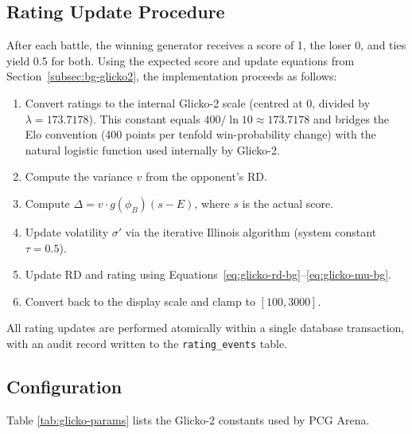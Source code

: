 \documentclass[shortabstract, mgr, english]{iithesis}
\begin{document}
\subsection{Rating Update Procedure}
\label{subsec:sd-glicko-update}

After each battle, the winning generator receives a score of 1, the loser 0, and ties
yield 0.5 for both. Using the expected score and update equations from
Section~\ref{subsec:bg-glicko2}, the implementation proceeds as follows:

\begin{enumerate}
    \item Convert ratings to the internal Glicko-2 scale (centred at 0, divided by
          $\lambda = 173.7178$).  This constant equals $400 / \ln 10 \approx 173.7178$
          and bridges the Elo convention (400 points per tenfold win-probability change)
          with the natural logistic function used internally by Glicko-2.
    \item Compute the variance $v$ from the opponent's RD.
    \item Compute $\Delta = v \cdot g(\phi_B)(s - E)$, where $s$ is the actual score.
    \item Update volatility $\sigma'$ via the iterative Illinois algorithm
          (system constant $\tau = 0.5$).
    \item Update RD and rating using Equations~\ref{eq:glicko-rd-bg}--\ref{eq:glicko-mu-bg}.
    \item Convert back to the display scale and clamp to $[100, 3000]$.
\end{enumerate}

All rating updates are performed atomically within a single database transaction, with
an audit record written to the \texttt{rating\_events} table.

\subsection{Configuration}
\label{subsec:sd-glicko-config}

Table \ref{tab:glicko-params} lists the Glicko-2 constants used by PCG Arena.
\end{document}
